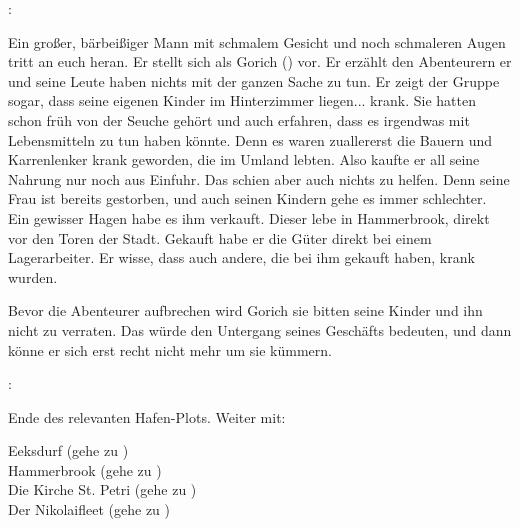 :

Ein großer, bärbeißiger Mann mit schmalem Gesicht und noch schmaleren Augen tritt an euch heran. Er stellt sich als Gorich (\blue{\ref{Gorich}}) vor. Er erzählt den Abenteurern er und seine Leute haben nichts mit der ganzen Sache zu tun. Er zeigt der Gruppe sogar, dass seine eigenen Kinder im Hinterzimmer liegen... krank. Sie hatten schon früh von der Seuche gehört und auch erfahren, dass es irgendwas mit Lebensmitteln zu tun haben könnte. Denn es waren zuallererst die Bauern und Karrenlenker krank geworden, die im Umland lebten. Also kaufte er all seine Nahrung nur noch aus Einfuhr. Das schien aber auch nichts zu helfen. Denn seine Frau ist bereits gestorben, und auch seinen Kindern gehe es immer schlechter. Ein gewisser Hagen habe es ihm verkauft. Dieser lebe in Hammerbrook, direkt vor den Toren der Stadt. Gekauft habe er die Güter direkt bei einem Lagerarbeiter. Er wisse, dass auch andere, die bei ihm gekauft haben, krank wurden.

Bevor die Abenteurer aufbrechen wird Gorich sie bitten seine Kinder und ihn nicht zu verraten. Das würde den Untergang seines Geschäfts bedeuten, und dann könne er sich erst recht nicht mehr um sie kümmern.

:




Ende des relevanten Hafen-Plots. Weiter mit:

Eeksdurf (gehe zu \blue{\ref{xd}}) \\
Hammerbrook (gehe zu \blue{\ref{arm}}) \\
Die Kirche St. Petri (gehe zu \blue{\ref{Petri}}) \\
Der Nikolaifleet (gehe zu \blue{\ref{Fleet}}) \\
